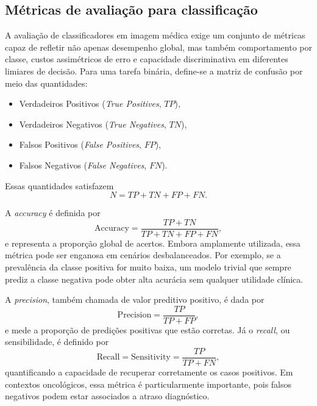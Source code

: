 \documentclass[tcc,capa]{texufpel}
\begin{document}
\subsection{Métricas de avaliação para classificação}

A avaliação de classificadores em imagem médica exige um conjunto de métricas capaz de refletir não apenas desempenho global, mas também comportamento por classe, custos assimétricos de erro e capacidade discriminativa em diferentes limiares de decisão. Para uma tarefa binária, define-se a matriz de confusão por meio das quantidades:
\begin{itemize}
    \item Verdadeiros Positivos (\textit{True Positives}, $TP$),
    \item Verdadeiros Negativos (\textit{True Negatives}, $TN$),
    \item Falsos Positivos (\textit{False Positives}, $FP$),
    \item Falsos Negativos (\textit{False Negatives}, $FN$).
\end{itemize}
Essas quantidades satisfazem
\begin{equation}
N = TP + TN + FP + FN.
\end{equation}

A \textit{accuracy} é definida por
\begin{equation}
\mathrm{Accuracy} = \frac{TP + TN}{TP + TN + FP + FN},
\end{equation}
e representa a proporção global de acertos. Embora amplamente utilizada, essa métrica pode ser enganosa em cenários desbalanceados. Por exemplo, se a prevalência da classe positiva for muito baixa, um modelo trivial que sempre prediz a classe negativa pode obter alta acurácia sem qualquer utilidade clínica.

A \textit{precision}, também chamada de valor preditivo positivo, é dada por
\begin{equation}
\mathrm{Precision} = \frac{TP}{TP + FP},
\end{equation}
e mede a proporção de predições positivas que estão corretas. Já o \textit{recall}, ou sensibilidade, é definido por
\begin{equation}
\mathrm{Recall} = \mathrm{Sensitivity} = \frac{TP}{TP + FN},
\end{equation}
quantificando a capacidade de recuperar corretamente os casos positivos. Em contextos oncológicos, essa métrica é particularmente importante, pois falsos negativos podem estar associados a atraso diagnóstico.
\end{document}
